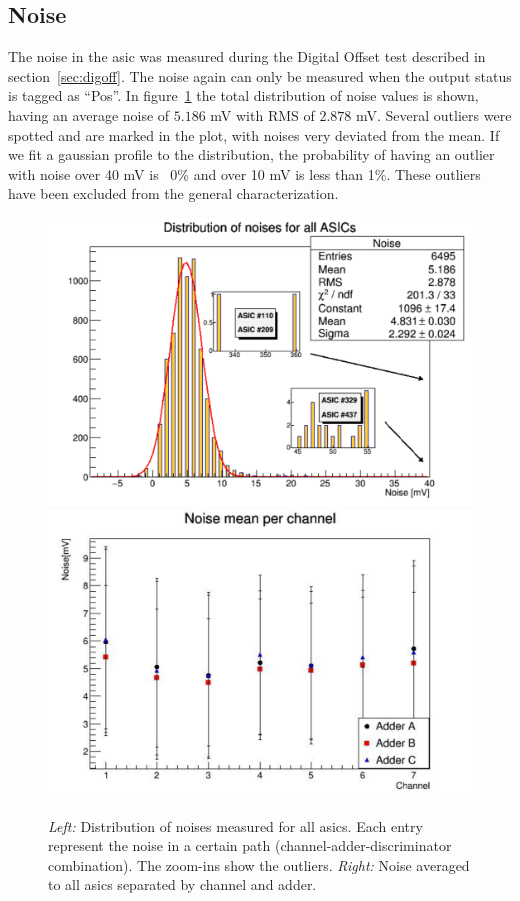 \documentclass[main.tex]{subfiles}
\begin{document}
\subsection{Noise}

The noise in the \gls{asic} was measured during the Digital Offset test described in section~\ref{sec:digoff}. The noise again can only be measured when the output status is tagged as ``Pos''. In figure~\ref{fig:noisedist} the total distribution of noise values is shown, having an average noise of $5.186$ mV with RMS of $2.878$ mV. Several outliers were spotted and are marked in the plot, with noises very deviated from the mean. If we fit a gaussian profile to the distribution, the probability of having an outlier with noise over 40 mV is ~0\% and over 10 mV is less than 1\%. These outliers have been excluded
from the general characterization.
\begin{figure}[h]
  \centering
  \includegraphics[width=\textwidth]{./Pictures/noisedist.pdf}
  \endminipage
  \includegraphics[width=\textwidth]{./Pictures/noisech.pdf}
  \endminipage
  \caption{\textit{Left:} Distribution of noises measured for all \glspl{asic}. Each entry represent the noise in a certain path (channel-adder-discriminator combination). The zoom-ins show the outliers. \textit{Right:} Noise averaged to all \glspl{asic} separated by channel and adder.}
  \label{fig:noisedist}
\end{figure}
\end{document}
